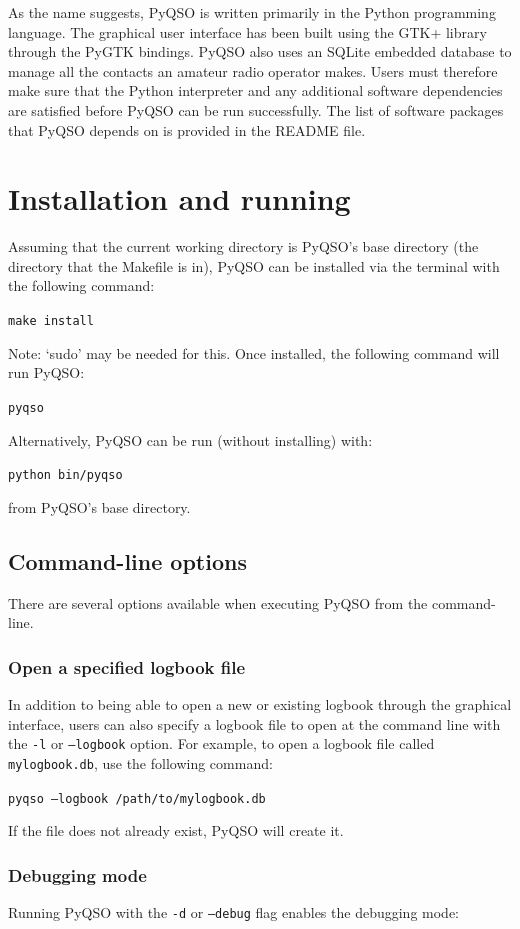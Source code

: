 \documentclass[11pt, a4paper]{report}
\begin{document}
As the name suggests, PyQSO is written primarily in the Python programming language. The graphical user interface has been built using the GTK+ library through the PyGTK bindings. PyQSO also uses an SQLite embedded database to manage all the contacts an amateur radio operator makes. Users must therefore make sure that the Python interpreter and any additional software dependencies are satisfied before PyQSO can be run successfully. The list of software packages that PyQSO depends on is provided in the README file.

\section{Installation and running}
Assuming that the current working directory is PyQSO's base directory (the directory that the Makefile is in), PyQSO can be installed via the terminal with the following command:

  \texttt{make install}

\noindent Note: `sudo' may be needed for this. Once installed, the following command will run PyQSO:

  \texttt{pyqso}

\noindent Alternatively, PyQSO can be run (without installing) with:

  \texttt{python bin/pyqso}

\noindent from PyQSO's base directory.

\subsection{Command-line options}
There are several options available when executing PyQSO from the command-line.

\subsubsection{Open a specified logbook file}
In addition to being able to open a new or existing logbook through the graphical interface, users can also specify a logbook file to open at the command line with the \texttt{-l} or \texttt{--logbook} option. For example, to open a logbook file called \texttt{mylogbook.db}, use the following command:

  \texttt{pyqso --logbook /path/to/mylogbook.db}

\noindent If the file does not already exist, PyQSO will create it.

\subsubsection{Debugging mode}
Running PyQSO with the \texttt{-d} or \texttt{--debug} flag enables the debugging mode:
\end{document}
